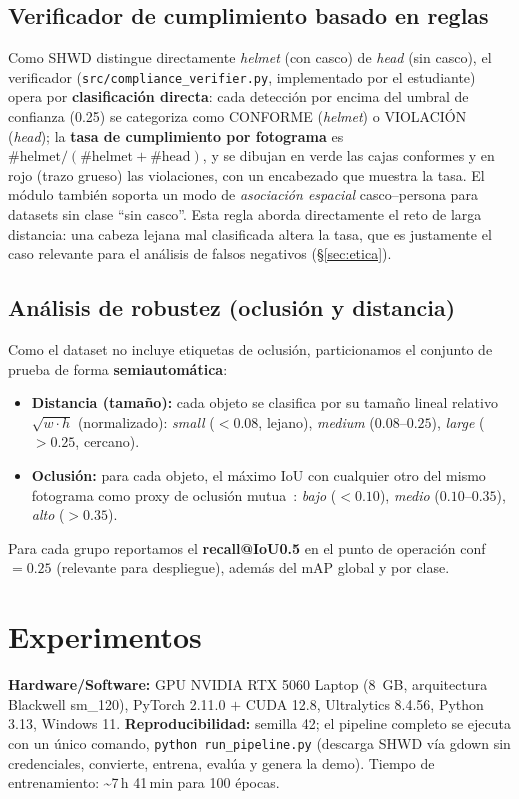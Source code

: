 \documentclass{article}
\newcommand{\traintime}{\textasciitilde{}7\,h 41\,min}
\begin{document}
\subsection{Verificador de cumplimiento basado en reglas}
Como SHWD distingue directamente \emph{helmet} (con casco) de \emph{head} (sin
casco), el verificador (\texttt{src/compliance\_verifier.py}, implementado por el
estudiante) opera por \textbf{clasificación directa}: cada detección por encima del
umbral de confianza (0.25) se categoriza como CONFORME (\emph{helmet}) o VIOLACIÓN
(\emph{head}); la \textbf{tasa de cumplimiento por fotograma} es
$\#\text{helmet} / (\#\text{helmet} + \#\text{head})$, y se dibujan en verde las
cajas conformes y en rojo (trazo grueso) las violaciones, con un encabezado que
muestra la tasa. El módulo también soporta un modo de \emph{asociación espacial}
casco--persona para datasets sin clase ``sin casco''. Esta regla aborda
directamente el reto de larga distancia: una cabeza lejana mal clasificada altera
la tasa, que es justamente el caso relevante para el análisis de falsos negativos
(\S\ref{sec:etica}).

\subsection{Análisis de robustez (oclusión y distancia)}
Como el dataset no incluye etiquetas de oclusión, particionamos el conjunto de
prueba de forma \textbf{semiautomática}:
\begin{itemize}
  \item \textbf{Distancia (tamaño):} cada objeto se clasifica por su tamaño lineal
  relativo $\sqrt{w\cdot h}$ (normalizado): \emph{small} ($<0.08$, lejano),
  \emph{medium} ($0.08$--$0.25$), \emph{large} ($>0.25$, cercano).
  \item \textbf{Oclusión:} para cada objeto, el máximo IoU con cualquier otro del
  mismo fotograma como proxy de oclusión mutua~\citep{wang2018repulsion}:
  \emph{bajo} ($<0.10$), \emph{medio} ($0.10$--$0.35$), \emph{alto} ($>0.35$).
\end{itemize}
Para cada grupo reportamos el \textbf{recall@IoU0.5} en el punto de operación
conf$=0.25$ (relevante para despliegue), además del mAP global y por clase.

\section{Experimentos}
\textbf{Hardware/Software:} GPU NVIDIA RTX 5060 Laptop (8~GB, arquitectura
Blackwell sm\_120), PyTorch 2.11.0 $+$ CUDA 12.8, Ultralytics 8.4.56, Python 3.13,
Windows 11. \textbf{Reproducibilidad:} semilla 42; el pipeline completo se ejecuta
con un único comando, \texttt{python run\_pipeline.py} (descarga SHWD vía gdown sin
credenciales, convierte, entrena, evalúa y genera la demo). Tiempo de
entrenamiento: \traintime{} para 100 épocas.
\end{document}
